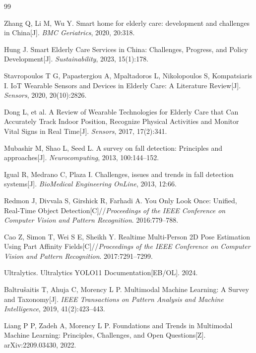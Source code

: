 \documentclass[UTF8,a4paper,zihao=-4,fontset=fandol]{ctexart}
\begin{document}
{}
\begin{thebibliography}{99}
\songti{}
\setlength{\itemsep}{0pt}
\setlength{\parsep}{0pt}
\setlength{\parskip}{0pt}

Zhang Q, Li M, Wu Y. Smart home for elderly care: development and challenges in China[J]. \textit{BMC Geriatrics}, 2020, 20:318.

Hung J. Smart Elderly Care Services in China: Challenges, Progress, and Policy Development[J]. \textit{Sustainability}, 2023, 15(1):178.

Stavropoulos T G, Papastergiou A, Mpaltadoros L, Nikolopoulos S, Kompatsiaris I. IoT Wearable Sensors and Devices in Elderly Care: A Literature Review[J]. \textit{Sensors}, 2020, 20(10):2826.

Dong L, et al. A Review of Wearable Technologies for Elderly Care that Can Accurately Track Indoor Position, Recognize Physical Activities and Monitor Vital Signs in Real Time[J]. \textit{Sensors}, 2017, 17(2):341.

Mubashir M, Shao L, Seed L. A survey on fall detection: Principles and approaches[J]. \textit{Neurocomputing}, 2013, 100:144--152.

Igual R, Medrano C, Plaza I. Challenges, issues and trends in fall detection systems[J]. \textit{BioMedical Engineering OnLine}, 2013, 12:66.

Redmon J, Divvala S, Girshick R, Farhadi A. You Only Look Once: Unified, Real-Time Object Detection[C]//\textit{Proceedings of the IEEE Conference on Computer Vision and Pattern Recognition}. 2016:779--788.

Cao Z, Simon T, Wei S E, Sheikh Y. Realtime Multi-Person 2D Pose Estimation Using Part Affinity Fields[C]//\textit{Proceedings of the IEEE Conference on Computer Vision and Pattern Recognition}. 2017:7291--7299.

Ultralytics. Ultralytics YOLO11 Documentation[EB/OL]. 2024.

Baltrušaitis T, Ahuja C, Morency L P. Multimodal Machine Learning: A Survey and Taxonomy[J]. \textit{IEEE Transactions on Pattern Analysis and Machine Intelligence}, 2019, 41(2):423--443.

Liang P P, Zadeh A, Morency L P. Foundations and Trends in Multimodal Machine Learning: Principles, Challenges, and Open Questions[Z]. arXiv:2209.03430, 2022.


\end{thebibliography}
\end{document}

